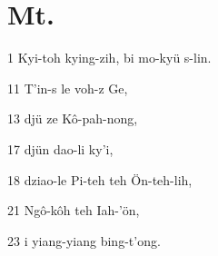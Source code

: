 \section{Mt.}%

\begin{sAbstract}
	\item[1] Kyi-toh kying-zih, bi mo-kyü s-lin.
	\item[11] T'in-s le voh-z Ge,
	\item[13] djü ze Kô-pah-nong,
	\item[17] djün dao-li ky'i,
	\item[18] dziao-le Pi-teh teh Ön-teh-lih,
	\item[21] Ngô-kôh teh Iah-'ön,
	\item[23] i yiang-yiang bing-t'ong.
\end{sAbstract}

